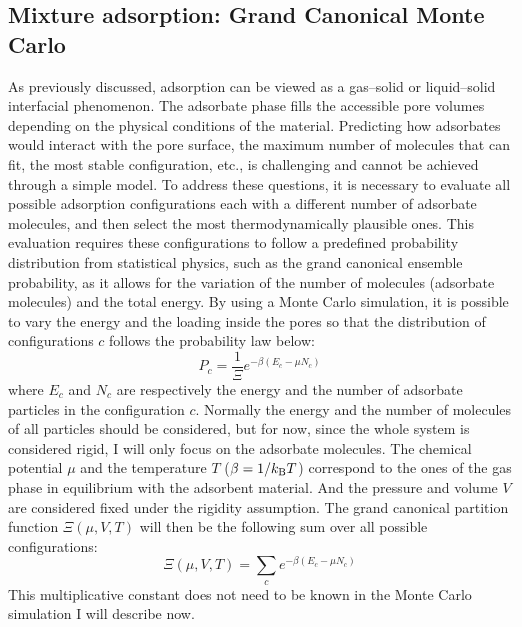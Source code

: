 \documentclass[main.tex]{subfiles}
\begin{document}
\subsection{Mixture adsorption: Grand Canonical Monte Carlo}\label{sct:GCMC}

As previously discussed, adsorption can be viewed as a gas--solid or liquid--solid interfacial phenomenon. The adsorbate phase fills the accessible pore volumes depending on the physical conditions of the material. Predicting how adsorbates would interact with the pore surface, the maximum number of molecules that can fit, the most stable configuration, etc., is challenging and cannot be achieved through a simple model. To address these questions, it is necessary to evaluate all possible adsorption configurations each with a different number of adsorbate molecules, and then select the most thermodynamically plausible ones. This evaluation requires these configurations to follow a predefined probability distribution from statistical physics, such as the grand canonical ensemble probability, as it allows for the variation of the number of molecules (adsorbate molecules) and the total energy. By using a Monte Carlo simulation, it is possible to vary the energy and the loading inside the pores so that the distribution of configurations $c$ follows the probability law below: 
\begin{equation}\label{eq:gc}
  P_c = \dfrac{1}{\Xi}e^{-\beta\left(E_c-\mu N_c\right)} 
\end{equation}
where $E_c$ and $N_c$ are respectively the energy and the number of adsorbate particles in the configuration $c$. Normally the energy and the number of molecules of all particles should be considered, but for now, since the whole system is considered rigid, I will only focus on the adsorbate molecules. The chemical potential $\mu$ and the temperature $T$ ($\beta=1/k_{\text{B}}T$) correspond to the ones of the gas phase in equilibrium with the adsorbent material. And the pressure and volume $V$ are considered fixed under the rigidity assumption. The grand canonical partition function $\Xi(\mu,V,T)$ will then be the following sum over all possible configurations: 
\begin{equation}
  \Xi(\mu,V,T) = \sum\limits_c e^{-\beta\left(E_c-\mu N_c\right)} 
\end{equation}
This multiplicative constant does not need to be known in the Monte Carlo simulation I will describe now. 
\end{document}
